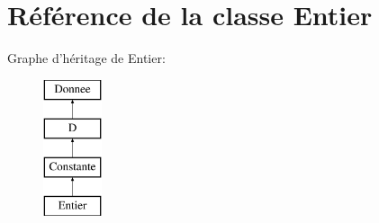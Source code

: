 \hypertarget{class_entier}{\section{Référence de la classe Entier}
\label{class_entier}
}
Graphe d'héritage de Entier\-:\begin{figure}[H]
\begin{center}
\leavevmode
\includegraphics[height=4.000000cm]{class_entier}
\end{center}
\end{figure}
